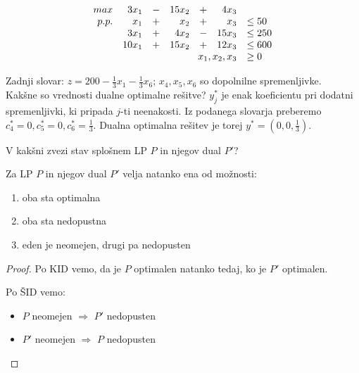 \documentclass[11pt, a4paper]{article}
\begin{document}
    \begin{example}
        \[
            \begin{array}{ r r c r c r l }
                max & 3x_1 & - & 15x_2 & + & 4x_3 \\
                p.p. & x_1 & + & x_2 & + & x_3 & \le 50 \\
                & 3x_1 & + & 4x_2 & - & 15x_3 & \le 250 \\
                & 10x_1 & + & 15x_2 & + & 12x_3 & \le 600 \\
                & \multicolumn{5}{r}{x_1,x_2,x_3} & \ge 0
            \end{array}
        \]
        
        Zadnji slovar: \(z=200 - \frac{1}{3}x_1 - \frac{1}{3}x_6\); \(x_4,x_5,x_6\) so dopolnilne spremenljivke. \\

        Kakšne so vrednosti dualne optimalne rešitve? \(y_j^*\) je enak koeficientu pri dodatni spremenljivki, ki pripada \(j\)-ti neenakosti. Iz podanega slovarja preberemo \(c_4^*=0,c_5^*=0,c_6^*=\frac{1}{3}\). Dualna optimalna rešitev je torej \({y^* = (0, 0, \frac{1}{3})}\).
    \end{example}

    V kakšni zvezi stav splošnem LP \(P\) in njegov dual \(P'\)?
    \begin{proposition}
        Za LP \(P\) in njegov dual \(P'\) velja natanko ena od možnosti:
        \begin{enumerate}
            \item oba sta optimalna
            \item oba sta nedopustna
            \item eden je neomejen, drugi pa nedopusten
        \end{enumerate}
    \end{proposition}

    \begin{proof}
        Po KID vemo, da je \(P\) optimalen natanko tedaj, ko je \(P'\) optimalen. \par
        Po ŠID vemo:
        \begin{itemize}
            \item \(P\) neomejen \(\Rightarrow\) \(P'\) nedopusten
            \item \(P'\) neomejen \(\Rightarrow\) \(P\) nedopusten
        \end{itemize}
    \end{proof}
\end{document}

